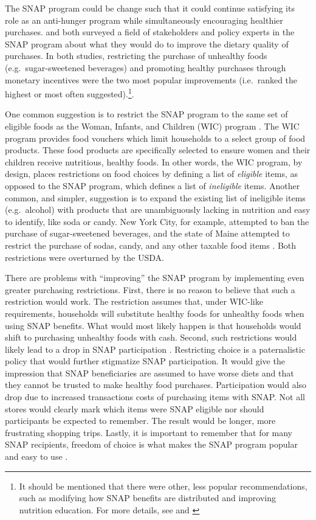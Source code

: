 \documentclass[12pt,letterpaperpaper,]{book}
\begin{document}
The SNAP program could be change such that it could continue satisfying
its role as an anti-hunger program while simultaneously encouraging
healthier purchases. \citet{blumenthal_strategies_2014} and
\citet{leung_qualitative_2013} both surveyed a field of stakeholders and
policy experts in the SNAP program about what they would do to improve
the dietary quality of purchases. In both studies, restricting the
purchase of unhealthy foods (e.g.~sugar-sweetened beverages) and
promoting healthy purchases through monetary incentives were the two
most popular improvements (i.e.~ranked the highest or most often
suggested).\footnote{It should be mentioned that there were other, less
  popular recommendations, such as modifying how SNAP benefits are
  distributed and improving nutrition education. For more details, see
  \citet{blumenthal_strategies_2014} and \citet{leung_qualitative_2013}}.

One common suggestion is to restrict the SNAP program to the same set of
eligible foods as the Woman, Infants, and Children (WIC) program
\citep{dinour_food_2007}. The WIC program provides food vouchers which
limit households to a select group of food products. These food products
are specifically selected to ensure women and their children receive
nutritious, healthy foods. In other words, the WIC program, by design,
places restrictions on food choices by defining a list of
\emph{eligible} items, as opposed to the SNAP program, which defines a
list of \emph{ineligible} items. Another common, and simpler, suggestion
is to expand the existing list of ineligible items (e.g.~alcohol) with
products that are unambiguously lacking in nutrition and easy to
identify, like soda or candy. New York City, for example, attempted to
ban the purchase of sugar-sweetened beverages, and the state of Maine
attempted to restrict the purchase of sodas, candy, and any other
taxable food items \citep{gundersen_snap_2015}. Both restrictions were
overturned by the USDA.

There are problems with ``improving'' the SNAP program by implementing
even greater purchasing restrictions. First, there is no reason to
believe that such a restriction would work. The restriction assumes
that, under WIC-like requirements, households will substitute healthy
foods for unhealthy foods when using SNAP benefits. What would most
likely happen is that households would shift to purchasing unhealthy
foods with cash. Second, such restrictions would likely lead to a drop
in SNAP participation \citep{gundersen_snap_2015}. Restricting choice is
a paternalistic policy that would further stigmatize SNAP participation.
It would give the impression that SNAP beneficiaries are assumed to have
worse diets and that they cannot be trusted to make healthy food
purchases. Participation would also drop due to increased transactions
costs of purchasing items with SNAP. Not all stores would clearly mark
which items were SNAP eligible nor should participants be expected to
remember. The result would be longer, more frustrating shopping trips.
Lastly, it is important to remember that for many SNAP recipients,
freedom of choice is what makes the SNAP program popular and easy to use
\citep{edin_snap_2013}.
\end{document}
